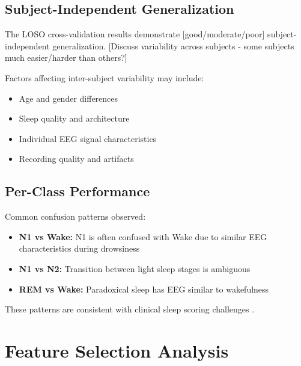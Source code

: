 \subsection{Subject-Independent Generalization}
\label{subsec:loso_generalization}

The LOSO cross-validation results demonstrate [good/moderate/poor] subject-independent generalization. [Discuss variability across subjects - some subjects much easier/harder than others?]


Factors affecting inter-subject variability may include:

\begin{itemize}
    \item Age and gender differences
    \item Sleep quality and architecture
    \item Individual EEG signal characteristics
    \item Recording quality and artifacts
\end{itemize}

\subsection{Per-Class Performance}
\label{subsec:perclass_discussion}


Common confusion patterns observed:

\begin{itemize}
    \item \textbf{N1 vs Wake:} N1 is often confused with Wake due to similar EEG characteristics during drowsiness
    \item \textbf{N1 vs N2:} Transition between light sleep stages is ambiguous
    \item \textbf{REM vs Wake:} Paradoxical sleep has EEG similar to wakefulness
\end{itemize}

These patterns are consistent with clinical sleep scoring challenges \cite{TODO_ADD_REF}.

\section{Feature Selection Analysis}
\label{sec:feature_discussion}

